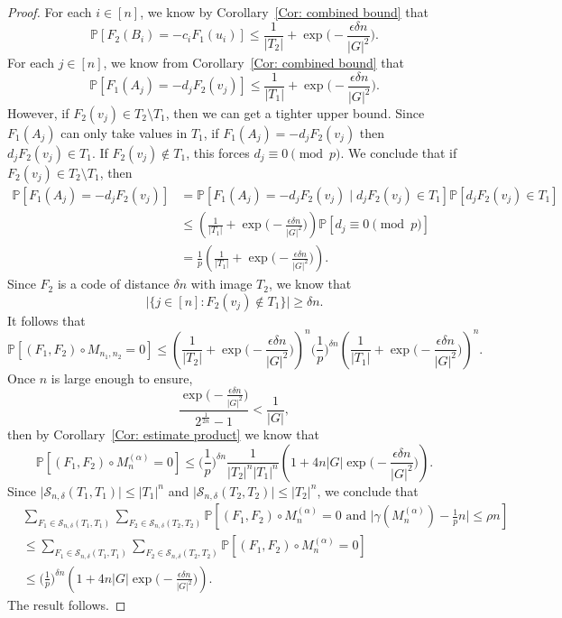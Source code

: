 \documentclass[12pt]{amsart}
\theoremstyle{definition}
\newcommand{\PPP}{\mathbb{P}}
\newcommand{\SSS}[3]{\mathcal{S}_{#1}(#2,#3)}
\newcommand{\Mnot}{M_{n_1,n_2}}
\newcommand{\Mna}{M_{n}^{(\alpha)}}
\newcommand{\abs}[1]{\vert#1\vert}
\begin{document}
\begin{proof}
For each $i\in [n]$, we know by Corollary~\ref{Cor: combined bound} that
\[
\PPP[F_2(B_i)=-c_iF_1(u_i)]
\leq  \frac{1}{\abs{T_2}} + \exp\Big(-\frac{\epsilon \delta n}{|G|^2}\Big).
\]
For each $j\in [n]$, we know from Corollary~\ref{Cor: combined bound} that
\[
\PPP[F_1(A_j)= -d_jF_2(v_j)]
\leq \frac{1}{\abs{T_1}} + \exp\Big(-\frac{\epsilon \delta n}{|G|^2}\Big).
\]
However, if $F_2(v_j)\in T_2\setminus T_1$, then we can get a tighter upper bound. Since $F_1(A_j)$ can only take values in $T_1$, if $F_1(A_j)= -d_jF_2(v_j)$ then $d_jF_2(v_j)\in T_1$. If $F_2(v_j)\notin T_1$, this forces $d_j\equiv 0\pmod{p}$.
We conclude that if $F_2(v_j)\in T_2\setminus T_1$, then
\begin{align*}
\PPP[F_1(A_j)= -d_jF_2(v_j)]
&= \PPP[F_1(A_j)= -d_jF_2(v_j) \mid d_jF_2(v_j)\in T_1]
\PPP[d_jF_2(v_j)\in T_1]\\
&\leq \left( \frac{1}{\abs{T_1}} + \exp\Big(-\frac{\epsilon \delta n}{|G|^2}\Big)\right)
\PPP[d_j\equiv 0\pmod{p}]\\
&= \frac{1}{p}
\left( \frac{1}{\abs{T_1}} + \exp\Big(-\frac{\epsilon \delta n}{|G|^2}\Big)\right).
\end{align*}
Since $F_2$ is a code of distance $\delta n$ with image $T_2$, we know that 
\[
\abs{\{j\in [n]: F_2(v_j)\notin T_1\}}
\geq \delta n.
\]
It follows that
\[
\PPP[(F_1,F_2)\circ \Mnot=0 ]
\leq 
\left( \frac{1}{\abs{T_2}} + \exp\Big(-\frac{\epsilon \delta n}{|G|^2}\Big)\right)^{n}
\Big(\frac{1}{p}\Big)^{\delta n}
\left(\frac{1}{\abs{T_1}} + \exp\Big(-\frac{\epsilon \delta n}{|G|^2}\Big)\right)^{n}.
\]
Once $n$ is large enough to ensure,
\[
\frac{\exp\Big(-\frac{\epsilon\delta  n}{|G|^2}\Big)}{2^{\frac{1}{2n}}-1}
<\frac{1}{\abs{G}},
\]
then by Corollary~\ref{Cor: estimate product} we know that
\[
\PPP[(F_1,F_2)\circ \Mna=0]
\leq \Big(\frac{1}{p}\Big)^{\delta n}
\frac{1}{\abs{T_2}^n \abs{T_1}^n}
\left( 1 + 4n\abs{G}\exp\Big(-\frac{\epsilon \delta n}{|G|^2}\Big)\right).
\]
Since $\abs{\SSS{n,\delta}{T_1}{T_1}}\leq \abs{T_1}^n$ and $\abs{\SSS{n,\delta}{T_2}{T_2}}\leq \abs{T_2}^n$, we conclude that
\begin{align*}
&\sum_{F_1\in \SSS{n,\delta}{T_1}{T_1}}
\sum_{F_2\in \SSS{n,\delta}{T_2}{T_2}}
\PPP[(F_1,F_2)\circ \Mna=0 \text{ and } \abs{\gamma(\Mna)-\tfrac{1}{p}n} \leq \rho n]\\
&\leq\sum_{F_1\in \SSS{n,\delta}{T_1}{T_1}}
\sum_{F_2\in \SSS{n,\delta}{T_2}{T_2}}
\PPP[(F_1,F_2)\circ \Mna=0]\\
&\leq \Big(\frac{1}{p}\Big)^{\delta n}
\left( 1 + 4n\abs{G}\exp\Big(-\frac{\epsilon \delta n}{|G|^2}\Big)\right).
\end{align*}
The result follows.
\end{proof}
\end{document}
